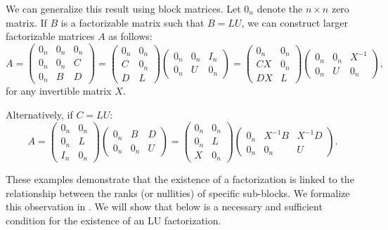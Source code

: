 \documentclass[10pt,twoside]{siamart1116}
\numberwithin{theorem}{section}
\begin{document}
We can generalize this result using block matrices. Let $0_n$ denote the $n \times n$ zero matrix. If $B$ is a factorizable matrix such that $B=LU$, we can construct larger factorizable matrices $A$ as follows:
\[
  A =
  \begin{pmatrix}
    0_n & 0_n & 0_n \\
    0_n & 0_n & C   \\
    0_n & B   & D
  \end{pmatrix}
  =
  \begin{pmatrix}
    0_n & 0_n \\
    C   & 0_n \\
    D   & L
  \end{pmatrix}
  \begin{pmatrix}
    0_n & 0_n & I_n \\
    0_n & U   & 0_n
  \end{pmatrix}
  =
  \begin{pmatrix}
    0_n & 0_n \\
    CX  & 0_n \\
    DX  & L
  \end{pmatrix}
  \begin{pmatrix}
    0_n & 0_n & X^{-1} \\
    0_n & U   & 0_n
  \end{pmatrix},
\]
for any invertible matrix $X$.

Alternatively, if $C = LU$:
\[
  A =
  \begin{pmatrix}
    0_n & 0_n \\
    0_n & L   \\
    I_n & 0_n
  \end{pmatrix}
  \begin{pmatrix}
    0_n & B   & D \\
    0_n & 0_n & U
  \end{pmatrix}
  =
  \begin{pmatrix}
    0_n & 0_n \\
    0_n & L   \\
    X   & 0_n
  \end{pmatrix}
  \begin{pmatrix}
    0_n & X^{-1} B & X^{-1} D \\
    0_n & 0_n      & U
  \end{pmatrix}.
\]

These examples demonstrate that the existence of a factorization is linked to the relationship between the ranks (or nullities) of specific sub-blocks. We formalize this observation in . We will show that  below is a necessary and sufficient condition for the existence of an LU factorization.
\end{document}
